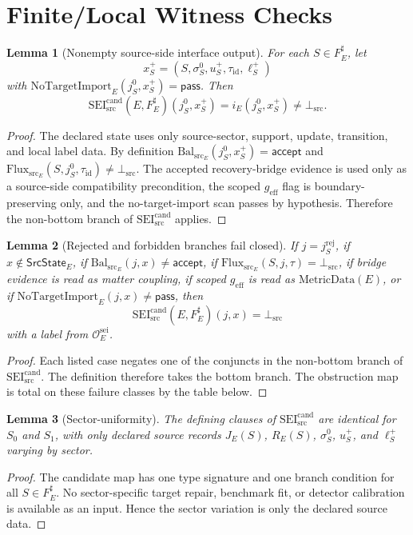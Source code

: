 \documentclass[11pt]{article}
\newcommand{\MetricData}{\mathrm{MetricData}}
\newcommand{\geff}{g_{\mathrm{eff}}}
\newcommand{\SEICand}{\mathrm{SEI}_{\mathrm{src}}^{\mathrm{cand}}}
\newcommand{\BalSrc}{\mathrm{Bal}_{\mathrm{src}}}
\newcommand{\FluxSrc}{\mathrm{Flux}_{\mathrm{src}}}
\newcommand{\NoTargetImport}{\mathrm{NoTargetImport}}
\newcommand{\BottomSrc}{\bot_{\mathrm{src}}}
\newtheorem{lemma}{Lemma}
\begin{document}
\section{Finite/Local Witness Checks}

\begin{lemma}[Nonempty source-side interface output]
For each \(S\in F_E^\sharp\), let
\[
  x_S^+=(S,\sigma_S^0,u_S^+,\tau_{\mathrm{id}},\ell_S^+)
\]
with \(\NoTargetImport_E(j_S^0,x_S^+)=\mathsf{pass}\). Then
\[
  \SEICand(E,F_E^\sharp)(j_S^0,x_S^+)=i_E(j_S^0,x_S^+)
  \neq \BottomSrc .
\]
\end{lemma}

\begin{proof}
The declared state uses only source-sector, support, update, transition, and
local label data. By definition \(\BalSrc_E(j_S^0,x_S^+)=\mathsf{accept}\)
and \(\FluxSrc_E(S,j_S^0,\tau_{\mathrm{id}})\neq\BottomSrc\). The accepted
recovery-bridge evidence is used only as a source-side compatibility
precondition, the scoped \(\geff\) flag is boundary-preserving only, and the
no-target-import scan passes by hypothesis. Therefore the non-bottom branch
of \(\SEICand\) applies.
\end{proof}

\begin{lemma}[Rejected and forbidden branches fail closed]
If \(j=j_S^{\mathrm{rej}}\), if \(x\notin\mathsf{SrcState}_E\), if
\(\BalSrc_E(j,x)\neq\mathsf{accept}\), if
\(\FluxSrc_E(S,j,\tau)=\BottomSrc\), if bridge evidence is read as matter
coupling, if scoped \(\geff\) is read as \(\MetricData(E)\), or if
\(\NoTargetImport_E(j,x)\neq\mathsf{pass}\), then
\[
  \SEICand(E,F_E^\sharp)(j,x)=\BottomSrc
\]
with a label from \(\mathcal{O}_E^{\mathrm{sei}}\).
\end{lemma}

\begin{proof}
Each listed case negates one of the conjuncts in the non-bottom branch of
\(\SEICand\). The definition therefore takes the bottom branch. The
obstruction map is total on these failure classes by the table below.
\end{proof}

\begin{lemma}[Sector-uniformity]
The defining clauses of \(\SEICand\) are identical for \(S_0\) and \(S_1\),
with only declared source records \(J_E(S)\), \(R_E(S)\),
\(\sigma_S^0\), \(u_S^+\), and \(\ell_S^+\) varying by sector.
\end{lemma}

\begin{proof}
The candidate map has one type signature and one branch condition for all
\(S\in F_E^\sharp\). No sector-specific target repair, benchmark fit, or
detector calibration is available as an input. Hence the sector variation is
only the declared source data.
\end{proof}
\end{document}

